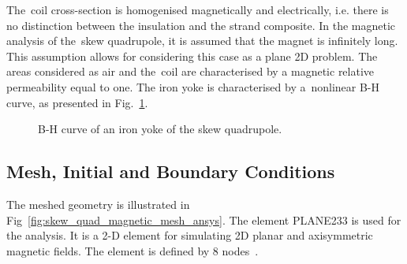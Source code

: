 The~coil cross-section is homogenised magnetically and electrically, i.e. there is no distinction between the insulation and the strand composite. In the magnetic analysis of the~skew quadrupole, it is assumed that the magnet is infinitely long. This assumption allows for considering this case as a plane 2D problem. The areas considered as air and the~coil are characterised by a magnetic relative permeability equal to one. The iron yoke is characterised by a~nonlinear B-H curve, as presented in Fig.~\ref{fig:b_h_curve}. 

\begin{figure}[H]
    \centering
    \caption{B-H curve of an iron yoke of the skew quadrupole.}
    \label{fig:b_h_curve}
\end{figure}


\subsection{Mesh, Initial and Boundary Conditions}

The meshed geometry is illustrated in Fig~\ref{fig:skew_quad_magnetic_mesh_ansys}. The element PLANE233 is used for the analysis. It is a 2-D element for simulating 2D planar and axisymmetric magnetic fields. The element is defined by 8 nodes~\cite{ansys_element_manual}.

